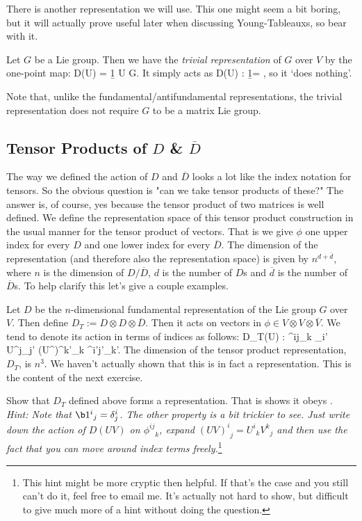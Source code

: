There is another representation we will use. This one might seem a bit boring, but it will actually prove useful later when discussing Young-Tableauxs, so bear with it. 

    Let $G$ be a Lie group. Then we have the \textit{trivial representation} of $G$ over $V$ by the one-point map:
    \be 
    \label{eqn:TrivialRepresentationGroup}
        D(U) = \b1 \qquad \forall U \in G. 
    \ee 
    It simply acts as
    \be 
    \label{eqn:TrivialRepresentationGroupAction}
        D(U) : \phi \mapsto \b1\phi = \phi,
    \ee 
    so it `does nothing'. 
\ed 

\br 
    Note that, unlike the fundamental/antifundamental representations, the trivial representation does not require $G$ to be a matrix Lie group. 
\er 

\subsection{Tensor Products of $D$ \& $\overline{D}$}

The way we defined the action of $D$ and $\overline{D}$ looks a lot like the index notation for tensors. So the obvious question is "can we take tensor products of these?" The answer is, of course, yes because the tensor product of two matrices is well defined. We define the representation space of this tensor product construction in the usual manner for the tensor product of vectors. That is we give $\phi$ one upper index for every $D$ and one lower index for every $\overline{D}$. The dimension of the representation (and therefore also the representation space) is given by $n^{d+\overline{d}}$, where $n$ is the dimension of $D/\overline{D}$, $d$ is the number of $D$s and $\overline{d}$ is the number of $\overline{D}$s. To help clarify this let's give a couple examples. 

\bex 
    Let $D$ be the $n$-dimensional fundamental representation of the Lie group $G$ over $V$. Then define $D_T := D\otimes D \otimes \overline{D}$. Then it acts on vectors in $\phi \in V\otimes V\otimes \overline{V}$. We tend to denote its action in terms of indices as follows:
    \bse 
        D_T(U) : {\phi^{ij}}_k _{i'} {U^j}_{j'} {\big(U^{\dagger}\big)^{k'}}_{k} {\phi^{i'j'}}_{k'}.
    \ese
    The dimension of the tensor product representation, $D_T$, is $n^3$. We haven't actually shown that this is in fact a representation. This is the content of the next exercise.
\eex 

\bbox 
    Show that $D_T$ defined above forms a representation. That is shows it obeys . \textit{Hint: Note that ${\b1^i}_j = \del^i_j$. The other property is a bit trickier to see. Just write down the action of $D(UV)$ on ${\phi^{ij}}_k$, expand ${(UV)^i}_j = {U^i}_k{V^k}_j$ and then use the fact that you can move around index terms freely.}\footnote{This hint might be more cryptic then helpful. If that's the case and you still can't do it, feel free to email me. It's actually not hard to show, but difficult to give much more of a hint without doing the question.}
\ebox 

